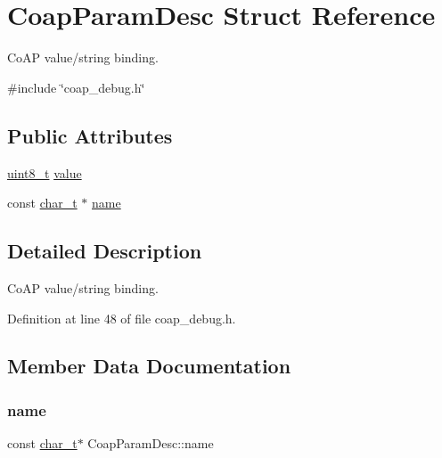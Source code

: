 \hypertarget{structCoapParamDesc}{}\section{Coap\+Param\+Desc Struct Reference}
\label{structCoapParamDesc}


Co\+AP value/string binding.  




{\ttfamily \#include \char`\"{}coap\+\_\+debug.\+h\char`\"{}}

\subsection*{Public Attributes}
\begin{DoxyCompactItemize}
\item 
\hyperlink{stdint_8h_aba7bc1797add20fe3efdf37ced1182c5}{uint8\+\_\+t} \hyperlink{structCoapParamDesc_a96f06c3730fe07d3933b52e47712d2ed}{value}
\item 
const \hyperlink{compiler__port_8h_a40bb5262bf908c328fbcfbe5d29d0201}{char\+\_\+t} $\ast$ \hyperlink{structCoapParamDesc_a0a7d711090097fae4c256548807be277}{name}
\end{DoxyCompactItemize}


\subsection{Detailed Description}
Co\+AP value/string binding. 

Definition at line 48 of file coap\+\_\+debug.\+h.



\subsection{Member Data Documentation}
\mbox{\label{structCoapParamDesc_a0a7d711090097fae4c256548807be277}} 
\subsubsection{\texorpdfstring{name}{name}}
{\footnotesize\ttfamily const \hyperlink{compiler__port_8h_a40bb5262bf908c328fbcfbe5d29d0201}{char\+\_\+t}$\ast$ Coap\+Param\+Desc\+::name}




